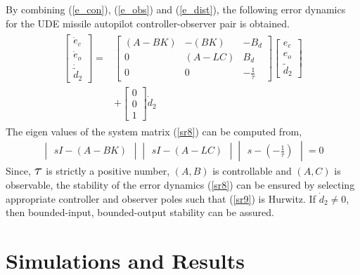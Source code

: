 \documentclass[conference]{IEEEtran}
\begin{document}
		By combining (\ref{e_con}), (\ref{e_obs}) and (\ref{e_dist}), the following error dynamics for the UDE missile autopilot controller-observer pair is obtained.
		\begin{eqnarray}
			\begin{aligned}
				\begin{bmatrix}
					\dot{e}_c \\
					\dot{e}_o \\
					\dot{\tilde{d}}_2
				\end{bmatrix} =& 
				\begin{bmatrix}
					(A - BK) & -(BK) & -B_d \\
					0 & (A - LC) & B_d \\
					0 & 0 & -\frac{1}{\tau}
				\end{bmatrix}
				\begin{bmatrix}
					e_c \\
					e_o \\
					\tilde{d}_2
				\end{bmatrix} \\
				& + 
				\begin{bmatrix}
					0 \\
					0 \\
					1
				\end{bmatrix} \dot{d}_2 \label{sr8}
		\end{aligned}
		\end{eqnarray}
		The eigen values of the system matrix (\ref{sr8}) can be computed from,
		\begin{eqnarray}
			\begin{vmatrix}
				sI - (A - BK)
			\end{vmatrix}
			\begin{vmatrix}
				sI - (A - LC)
			\end{vmatrix}
			\begin{vmatrix}
				s - (-\frac{1}{\tau})
			\end{vmatrix} = 0 \label{sr9}
		\end{eqnarray}
		Since, $\mathlarger{\mathlarger{\mathlarger{\tau}}}$ is strictly a positive number, $(A, B)$ is controllable and $(A, C)$ is observable, the stability of the error dynamics (\ref{sr8})  can be ensured by selecting appropriate controller and observer poles such that (\ref{sr9}) is Hurwitz. If $\dot{d}_2 \ne 0$, then bounded-input, bounded-output stability can be assured. 
		

\section{Simulations and Results}	\label{simulations}
\end{document}
